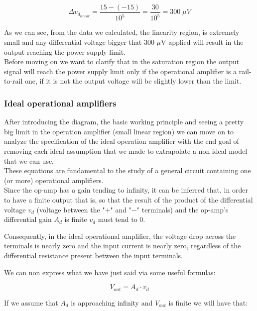 \documentclass[../main.tex]{subfiles}
\begin{document}
\begin{equation}
	\Delta v_{d_{linear}} = \frac{15 - (-15)}{10^5} = \frac{30}{10^5} = 300\; \mu \unit{V}
\end{equation}

As we can see, from the data we calculated, the linearity region, is extremely small and any differential voltage bigger that 300 $\mu$V applied will result in the output reaching the power supply limit.\\

Before moving on we want to clarify that in the saturation region the output signal will reach the power supply limit only if the operational amplifier is a rail-to-rail one, if it is not the output voltage will be slightly lower than the limit.

\subsubsection{Ideal operational amplifiers}


After introducing the diagram, the basic working principle and seeing a pretty big limit in the operation amplifier (small linear region) we can move on to analyze the specification of the ideal operation amplifier with the end goal of removing each ideal assumption that we made to extrapolate a non-ideal model that we can use.\\

These equations are fundamental to the study of a general circuit containing one (or more) operational amplifiers.\\ 

Since the op-amp has a gain tending to infinity, it can be inferred that, in order to have a finite output that is, so that the result of the product of the differential voltage $v_d$ (voltage between the "$+$" and "$-$" terminals) and the op-amp’s differential gain $A_d$ is finite $v_d$ must tend to 0.

Consequently, in the ideal operational amplifier, the voltage drop across the terminals is nearly zero and the input current is nearly zero, regardless of the differential resistance present between the input terminals. 

We can non express what we have just said via some useful formulas:

\begin{equation}
	V_{out} = A_d \cdot v_d
\end{equation}

If we assume that $A_d$ is approaching infinity and $V_{out}$ is finite we will have that:
\end{document}
